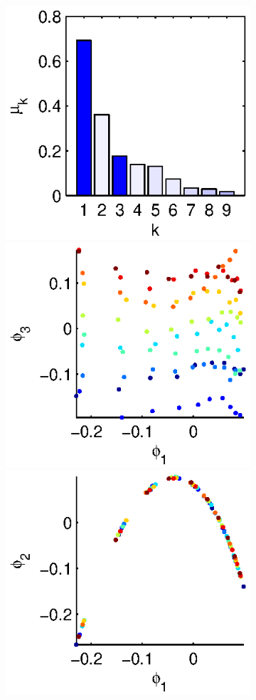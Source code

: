 \documentclass[3p]{elsarticle}
\begin{document}
\begin{figure}[t]
\begin{subfigure}[t]{1.5in}
\vspace{1.2in}
\caption{}
\end{subfigure}
%
\begin{subfigure}[t]{1.5in}
\centering
\includegraphics[height=\figheight]{chemotaxis2_evals}
\includegraphics[height=\figheight]{chemotaxis2_embed_good}
\includegraphics[height=\figheight]{chemotaxis2_embed_bad}

\end{subfigure}
\end{figure}
\end{document}
